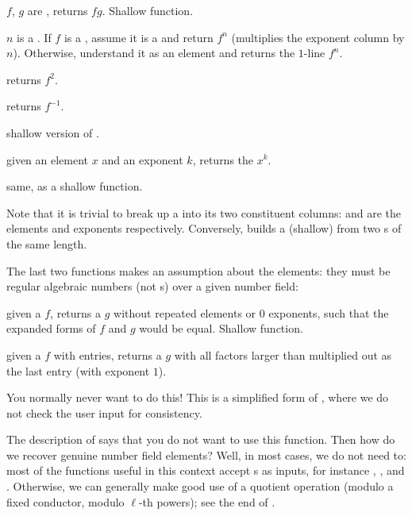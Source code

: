  $f$, $g$ are , returns
$fg$. Shallow function.

 $n$ is a . If $f$ is a ,
assume it is a  and return $f^n$ (multiplies the exponent column
by $n$). Otherwise, understand it as an element and returns the $1$-line
 $f^n$.

 returns $f^2$.

 returns $f^{-1}$.

 shallow version of .

 given an element $x$ and an exponent
$k$, returns the  $x^k$.

 same, as a shallow function.

Note that it is trivial to break up a  into its two constituent
columns:  and  are the elements and exponents
respectively. Conversely,  builds a (shallow)  from
two s of the same length.

The last two functions makes an assumption about the elements: they must be
regular algebraic numbers (not s) over a given number field:

 given a  $f$, returns a 
$g$ without repeated elements or 0 exponents, such that the expanded forms
of $f$ and $g$ would be equal. Shallow function.

 given a  $f$ with
 entries, returns a  $g$ with all factors larger than
 multiplied out as the last entry (with exponent $1$).

 You normally never want to do this!
This is a simplified form of , where we do not check the
user input for consistency.

The description of  says that you do not want to use this
function. Then how do we recover genuine number field elements? Well, in
most cases, we do not need to: most of the functions useful in this
context accept s as inputs, for instance ,
,  and . Otherwise, we can
generally make good use of a quotient operation (modulo a fixed conductor,
modulo $\ell$-th powers); see the end of .

